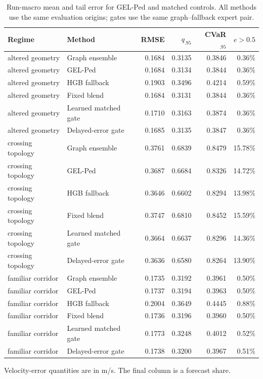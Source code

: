 \begin{table}[!htbp]
\centering
\caption{Run-macro mean and tail error for GEL-Ped and matched controls. All methods use the same evaluation origins; gates use the same graph--fallback expert pair.}
\label{tab:r3-tail-controls}
\small
\setlength{\tabcolsep}{4.2pt}
\renewcommand{\arraystretch}{1.08}
\begin{tabular}{llrrrr}
\toprule
Regime & Method & RMSE & $q_{.95}$ & CVaR$_{.95}$ & $e>0.5$ \\
\midrule
altered geometry & Graph ensemble & 0.1684 & 0.3135 & 0.3846 & 0.36\% \\
altered geometry & GEL-Ped & 0.1684 & 0.3134 & 0.3844 & 0.36\% \\
altered geometry & HGB fallback & 0.1903 & 0.3496 & 0.4214 & 0.59\% \\
altered geometry & Fixed blend & 0.1684 & 0.3131 & 0.3844 & 0.36\% \\
altered geometry & Learned matched gate & 0.1710 & 0.3163 & 0.3874 & 0.36\% \\
altered geometry & Delayed-error gate & 0.1685 & 0.3135 & 0.3847 & 0.36\% \\
crossing topology & Graph ensemble & 0.3761 & 0.6839 & 0.8479 & 15.78\% \\
crossing topology & GEL-Ped & 0.3687 & 0.6684 & 0.8326 & 14.72\% \\
crossing topology & HGB fallback & 0.3646 & 0.6602 & 0.8294 & 13.98\% \\
crossing topology & Fixed blend & 0.3747 & 0.6810 & 0.8452 & 15.59\% \\
crossing topology & Learned matched gate & 0.3664 & 0.6637 & 0.8296 & 14.36\% \\
crossing topology & Delayed-error gate & 0.3636 & 0.6580 & 0.8264 & 13.90\% \\
familiar corridor & Graph ensemble & 0.1735 & 0.3192 & 0.3961 & 0.50\% \\
familiar corridor & GEL-Ped & 0.1737 & 0.3194 & 0.3963 & 0.50\% \\
familiar corridor & HGB fallback & 0.2004 & 0.3649 & 0.4445 & 0.88\% \\
familiar corridor & Fixed blend & 0.1736 & 0.3196 & 0.3960 & 0.50\% \\
familiar corridor & Learned matched gate & 0.1773 & 0.3248 & 0.4012 & 0.52\% \\
familiar corridor & Delayed-error gate & 0.1738 & 0.3200 & 0.3967 & 0.51\% \\
\bottomrule
\end{tabular}
\par\vspace{2pt}\footnotesize Velocity-error quantities are in m/s. The final column is a forecast share.
\end{table}
